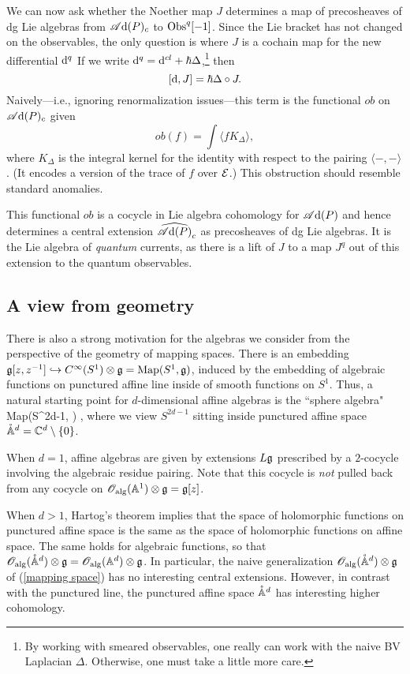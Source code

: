 We can now ask whether the Noether map $J$ determines a map of precosheaves of dg Lie algebras from $\mathscr A{\rm d}(P)_c$ to ${\rm Obs}^q[-1]$.
Since the Lie bracket has not changed on the observables, 
the only question is where $J$ is a cochain map for the new differential ${\rm d}^q$
If we write ${\rm d}^q = {\rm d}^{cl} + \hbar \Delta$,\footnote{By working with smeared observables, one really can work with the naive BV Laplacian $\Delta$. Otherwise, one must take a little more care.} then 
\[
[{\rm d},J] = \hbar \Delta \circ J.
\]
Naively---i.e., ignoring renormalization issues---this term is the functional $ob$ on $\mathscr A{\rm d}(P)_c$ given 
\[
ob(f) = \int \langle f K_\Delta \rangle,
\]
where $K_\Delta$ is the integral kernel for the identity with respect to the pairing $\langle-,-\rangle$.
(It encodes a version of the trace of $f$ over $\mathcal E$.)
This obstruction should resemble standard anomalies.

This functional $ob$ is a cocycle in Lie algebra cohomology for $\mathscr A{\rm d}(P)$ and hence determines a central extension $\widehat{\mathscr A{\rm d}(P)}_c$ as precosheaves of dg Lie algebras.
It is the Lie algebra of {\em quantum} currents, as there is a lift of $J$ to a map $J^q$ out of this extension to the quantum observables.

\subsection*{A view from geometry}

There is also a strong motivation for the algebras we consider from the perspective of the geometry of mapping spaces. 
There is an embedding $\mathfrak g[z,z^{-1}] \hookrightarrow C^\infty(S^1) \otimes \mathfrak g = {\rm Map}(S^1, \mathfrak g)$, induced by the embedding of algebraic functions on punctured affine line inside of smooth functions on $S^1$. 
Thus, a natural starting point for $d$-dimensional affine algebras is the ``sphere algebra" 
\beqn\label{mapping space}
{\rm Map}(S^{2d-1}, \fg) ,
\eeqn
where we view $S^{2d-1}$ sitting inside punctured affine space~$\mathring{\mathbb A}^d = \mathbb C^d \setminus \{0\}$. 

When $d=1$, affine algebras are given by extensions $L\mathfrak g$ prescribed by a $2$-cocycle involving the algebraic residue pairing. 
Note that this cocycle is {\em not} pulled back from any cocycle on $\mathscr O_{\rm alg}(\mathbb A^1) \otimes \mathfrak g = \mathfrak g[z]$. 

When $d > 1$, Hartog's theorem implies that the space of holomorphic functions on punctured affine space is the same as the space of holomorphic functions on affine space.
The same holds for algebraic functions, so that $\mathscr O_{\rm alg}(\mathring{\mathbb A}^{d}) \otimes \mathfrak g = \mathscr O_{\rm alg}(\mathbb A^d) \otimes \mathfrak g$. 
In particular, the naive generalization $\mathscr O_{\rm alg}(\mathring{\mathbb A}^{d}) \otimes \mathfrak g$ of (\ref{mapping space}) has no interesting central extensions. 
However, in contrast with the punctured line, the punctured affine space $\mathring{\mathbb A}^{d}$ has interesting higher cohomology. 

